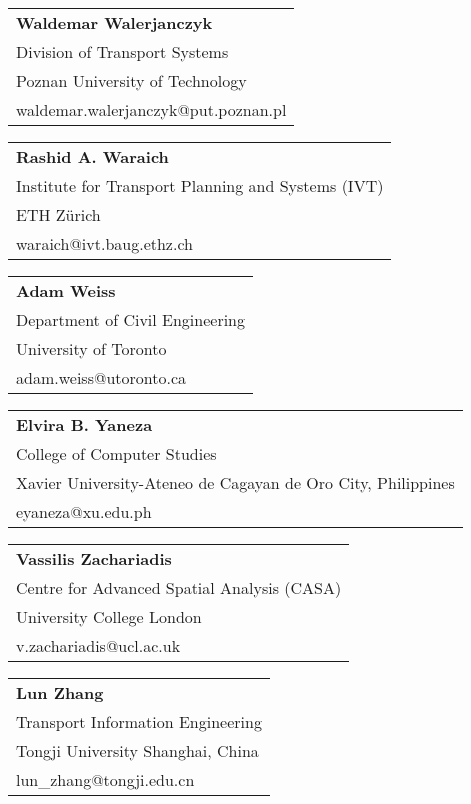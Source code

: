 \begin{tabular}[width=0.48\textwidth]{@{}l}
\textbf{Waldemar Walerjanczyk} \\
Division of Transport Systems \\
Poznan University of Technology \\
waldemar.walerjanczyk@put.poznan.pl \\
\end{tabular}

\begin{tabular}[width=0.48\textwidth]{@{}l}
\textbf{Rashid A. Waraich} \\
Institute for Transport Planning and Systems (IVT) \\
ETH Zürich \\
waraich@ivt.baug.ethz.ch \\
\end{tabular}

\begin{tabular}[width=0.48\textwidth]{@{}l}
\textbf{Adam Weiss} \\
Department of Civil Engineering \\
University of Toronto \\
adam.weiss@utoronto.ca  \\
\end{tabular}

\begin{tabular}[width=0.48\textwidth]{@{}l}
\textbf{Elvira B. Yaneza} \\
College of Computer Studies \\
Xavier University-Ateneo de Cagayan de Oro City, Philippines \\
eyaneza@xu.edu.ph  \\
\end{tabular}

\begin{tabular}[width=0.48\textwidth]{@{}l}
\textbf{Vassilis Zachariadis} \\
Centre for Advanced Spatial Analysis (CASA) \\
University College London \\
v.zachariadis@ucl.ac.uk \\
\end{tabular}

\begin{tabular}[width=0.48\textwidth]{@{}l}
\textbf{Lun Zhang} \\
Transport Information Engineering \\
Tongji University Shanghai, China \\
lun\_zhang@tongji.edu.cn \\
\end{tabular}

